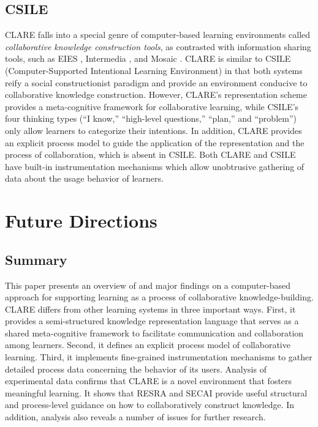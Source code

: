 \subsection{CSILE}

CLARE falls into a special genre of computer-based learning environments
called {\it collaborative knowledge construction tools\/}, as contrasted
with information sharing tools, such as EIES \cite{Hiltz88}, Intermedia
\cite{Yankelovich88}, and Mosaic \cite{Andreessen93}. CLARE is similar to
CSILE (Computer-Supported Intentional Learning Environment)
\cite{Scardamadia93,Scardamadia92} in that both systems reify a social
constructionist paradigm and provide an environment conducive to
collaborative knowledge construction. However, CLARE's representation
scheme provides a meta-cognitive framework for collaborative learning,
while CSILE's four thinking types (``I know,'' ``high-level questions,''
``plan,'' and ``problem'') only allow learners to categorize their
intentions. In addition, CLARE provides an explicit process model to guide
the application of the representation and the process of collaboration,
which is absent in CSILE. Both CLARE and CSILE have built-in
instrumentation mechanisms which allow unobtrusive gathering of data about
the usage behavior of learners.


\section{Future Directions}
\label{sec:conclusions}

\subsection{Summary}

This paper presents an overview of and major findings on a
computer-based approach for supporting learning as a process of
collaborative knowledge-building.  CLARE differs from other learning
systems in three important ways. First, it provides a semi-structured
knowledge representation language that serves as a shared meta-cognitive
framework to facilitate communication and collaboration among
learners. Second, it defines an explicit process model of collaborative
learning. Third, it implements fine-grained instrumentation mechanisms to
gather detailed process data concerning the behavior of its users. Analysis
of experimental data confirms that CLARE is a novel environment that
fosters meaningful learning. It shows that RESRA and SECAI provide useful
structural and process-level guidance on how to collaboratively construct
knowledge. In addition, analysis also reveals a number of issues for
further research.


